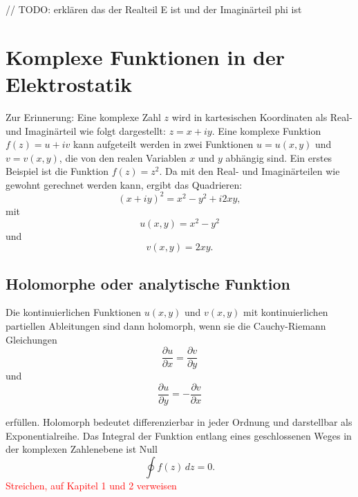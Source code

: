 // TODO: erklären das der Realteil E ist und der Imaginärteil phi ist 
\section{Komplexe Funktionen in der Elektrostatik
\label{elektro:section:Funktionen-komplexer-Var}}
Zur Erinnerung: Eine komplexe Zahl $z$ wird in kartesischen Koordinaten als Real- und Imaginärteil wie folgt dargestellt: $z = x + iy$.
Eine komplexe Funktion $f(z) = u + iv$ kann aufgeteilt werden in zwei Funktionen $u = u(x,y)$ und $v = v(x,y)$, die von den realen Variablen $x$ und $y$ abhängig sind.
Ein erstes Beispiel ist die Funktion $f(z) = z^{2}$.
Da mit den Real- und Imaginärteilen wie gewohnt gerechnet werden kann, ergibt das Quadrieren: 
\begin{equation}
	(x+iy)^{2} = x^{2} - y^{2} + i2xy,
\end{equation} 
mit
\begin{equation}
	u(x,y) = x^{2} - y^{2}
\end{equation} 
und 
\begin{equation}
	v(x,y) = 2xy.
\end{equation}

\subsection{Holomorphe oder analytische Funktion
\label{elektro:subsection:holomorph}}
Die kontinuierlichen Funktionen $u(x,y)$ und $v(x,y)$ mit kontinuierlichen partiellen Ableitungen sind dann holomorph, wenn sie die Cauchy-Riemann Gleichungen
\begin{equation}
	\label{elektro:subsection:holomorph:Cauchy1}
	\frac{\partial u}{\partial x} = \frac{\partial v}{\partial y}
\end{equation}
und 
\begin{equation}
\label{elektro:subsection:holomorph:Cauchy2}
	\frac{\partial u}{\partial y} =
	- \frac{\partial v}{\partial x}
\end{equation}

erfüllen.
Holomorph bedeutet differenzierbar in jeder Ordnung und darstellbar als Exponentialreihe.
Das Integral der Funktion entlang eines geschlossenen Weges in der komplexen Zahlenebene ist Null
\begin{equation}
	\oint f(z) \,dz = 0.
\end{equation}
\textcolor{red}{Streichen, auf Kapitel 1 und 2 verweisen}

